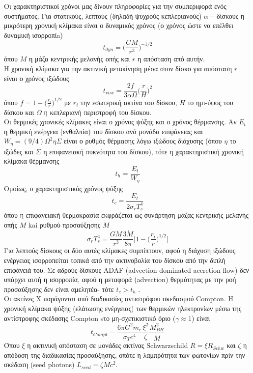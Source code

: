 Οι χαρακτηριστικοί χρόνοι μας δίνουν πληροφορίες για την συμπεριφορά ενός συστήματος. Για στατικούς, λεπτούς (δηλαδή ψυχρούς κεπλεριανούς) $\alpha-$δίσκους η μικρότερη χρονική κλίμακα είναι ο δυναμικός χρόνος (ο χρόνος ώστε να επέλθει δυναμική ισορροπίa)\cite{spruit2010accretion}
\begin{equation}
    t_{dyn} = \Big( \dfrac{GM}{r^3} \Big)^{-1/2}
\end{equation}
όπου $M$ η μάζα κεντρικής μελανής οπής και $r$ η απόσταση από αυτήν.\\
Η χρονική κλίμακα για την ακτινική μετακίνηση μέσα στον δίσκο για απόσταση $r$ είναι ο χρόνος ιξώδους
\begin{equation}
    t_{visc} = \dfrac{2f}{3 \alpha \Omega}   \Big( \dfrac{r}{H} \Big)^{2}
\end{equation}
όπου $f=1-\big(\frac{r_i}{r})^{1/2}$ με $r_i$ την εσωτερική ακτίνα του δίσκου, $H$ το ημι-ύψος του δίσκου και $\Omega$ η κεπλεριανή περιστροφή του δίσκου.\\
Οι θερμικές χρονικές κλίμακες είναι ο χρόνος ψύξης και ο χρόνος θέρμανσης. Αν $E_t$ η θερμική ενέργεια (ενθαλπία) του δίσκου ανά μονάδα επιφάνειας και $W_\eta=(9/4) \Omega^2 \eta \Sigma$ είναι ο ρυθμός θέρμασης λόγω ιξώδους διάχυσης (όπου $\eta$ το ιξώδες και $\Sigma$ η επιφανειακή πυκνότητα του δίσκου), τότε η χαρακτηριστική χρονική κλίμακα θέρμανσης
\begin{equation}
    t_{h} = \dfrac{E_t}{W_\eta}
\end{equation}
Ομοίως, ο χαρακτηριστικός χρόνος ψύξης
\begin{equation}
    t_{c} = \dfrac{E_t}{2 \sigma_r T_s^4}
\end{equation}
όπου η επιφανειακή θερμοκρασία εκφράζεται ως συνάρτηση μάζας κεντρικής μελανής οπής $M$ kai ρυθμού προσαύξησης $\dot M$ $$ \sigma_r T_s^4 = \dfrac{GM}{r^3} \dfrac{3\dot M}{8\pi} \Big[ 1-\big(\frac{r_i}{r})^{1/2}\Big]$$
Για λεπτούς δίσκους οι δύο αυτές κλίμακες συμπίπτουν, αφού η διάχυση ιξώδους ενέργειας ισορροπείται τοπικά από την ακτινοβολία του δίσκου από την διπλή επιφάνειά του. Σε αδρούς δίσκους \textlatin{ADAF (advection dominated accretion flow)} δεν υπάρχει αυτή η ισορροπία, αφού η μεταφορά \textlatin{(advection)} θερμότητας με την ροή προσαύξησης δεν είναι αμελητέα- τότε $t_c>t_h$ \cite{spruit2010accretion}.\\
Οι ακτίνες Χ παράγονται από διαδικασίες αντιστρόφου σκεδασμού \textlatin{Compton.} Η χρονική κλίμακα ψύξης (ελάτωσης ενέργειας) των θερμικών ηλεκτρονίων μέσω της αντίστροφης σκέδασης \textlatin{Compton} sτο μη-σχετικιστικό όριο ($\gamma \approx 1$) είναι
\begin{equation}
    t_{Compt} = \dfrac{6\pi G^2 m_e}{\sigma_T c^4} \dfrac{\xi ^2}{\zeta} \dfrac{M_{BH}^2}{\dot M} 
\end{equation}
Όπου $\xi$ η ακτινική απόσταση σε μονάδες ακτίνας \textlatin{Schwarzschild} $R=\xi R_{Schw}$ και $\zeta$ η απόδοση της διαδικασίας προσαύξησης, οπότε η λαμπρότητα των φωτονίων πρίν την σκέδαση (\textlatin{seed photons}) $L_{seed}=\zeta \dot{M} c^2$.
 
